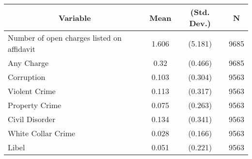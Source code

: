\begin{tabular}{l c c  c}\hline\hline
\multicolumn{1}{c}{\textbf{Variable}} & \textbf{Mean}
 & \textbf{(Std. Dev.)} & \textbf{N}\\ \hline
Number of open charges listed on affidavit & 1.606 & (5.181)  & 9685\\
Any Charge & 0.32 & (0.466)  & 9685\\
Corruption & 0.103 & (0.304)  & 9563\\
Violent Crime & 0.113 & (0.317)  & 9563\\
Property Crime & 0.075 & (0.263)  & 9563\\
Civil Disorder & 0.134 & (0.341)  & 9563\\
White Collar Crime & 0.028 & (0.166)  & 9563\\
Libel & 0.051 & (0.221)  & 9563\\
\hline\end{tabular}
